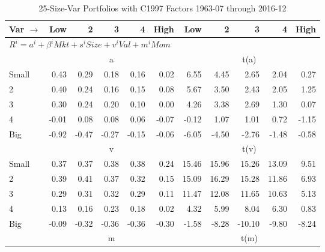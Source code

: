 
\begin{table}[!ht]
\centering
\caption{25-Size-Var Portfolios with C1997 Factors 1963-07 through 2016-12}
\begin{tabular}{lrrrrrrrrrr}
  \toprule
    Var $\rightarrow$ & Low & 2 & 3 & 4 & High & Low & 2 & 3 & 4 & High \\ 
  \midrule
  \multicolumn{11}{l}{$R^i=a^i+\beta^iMkt+s^iSize+v^iVal+m^iMom$} \\

  
    
      & \multicolumn{5}{c}{a} & \multicolumn{5}{c}{t(a)}
    
    \\
      \cmidrule(r){2-6} \cmidrule(r){7-11}

    Small   & 0.43  & 0.29  & 0.18  & 0.16  & 0.02  & 6.55  & 4.45  & 2.65  & 2.04  & 0.27  \\
         2  & 0.40  & 0.24  & 0.16  & 0.15  & 0.08  & 5.67  & 3.50  & 2.43  & 2.05  & 1.25  \\
         3  & 0.30  & 0.24  & 0.20  & 0.10  & 0.00  & 4.26  & 3.38  & 2.69  & 1.30  & 0.07  \\
         4  & -0.01  & 0.08  & 0.08  & 0.06  & -0.07  & -0.12  & 1.07  & 1.01  & 0.72  & -1.15  \\
    Big     & -0.92  & -0.47  & -0.27  & -0.15  & -0.06  & -6.05  & -4.50  & -2.76  & -1.48  & -0.58  \\

  
    
      & \multicolumn{5}{c}{v} & \multicolumn{5}{c}{t(v)}
    
    \\
      \cmidrule(r){2-6} \cmidrule(r){7-11}

    Small   & 0.37  & 0.37  & 0.38  & 0.38  & 0.24  & 15.46  & 15.96  & 15.26  & 13.09  & 9.51  \\
         2  & 0.39  & 0.41  & 0.37  & 0.32  & 0.15  & 15.09  & 16.29  & 15.28  & 11.86  & 6.93  \\
         3  & 0.29  & 0.31  & 0.32  & 0.29  & 0.11  & 11.47  & 12.08  & 11.65  & 10.63  & 5.13  \\
         4  & 0.13  & 0.16  & 0.23  & 0.18  & 0.02  & 4.32  & 5.99  & 8.04  & 6.30  & 0.83  \\
    Big     & -0.09  & -0.32  & -0.36  & -0.36  & -0.30  & -1.58  & -8.28  & -10.10  & -9.80  & -8.24  \\

  
    
      & \multicolumn{5}{c}{m} & \multicolumn{5}{c}{t(m)}
    

\end{tabular}
\end{table}
